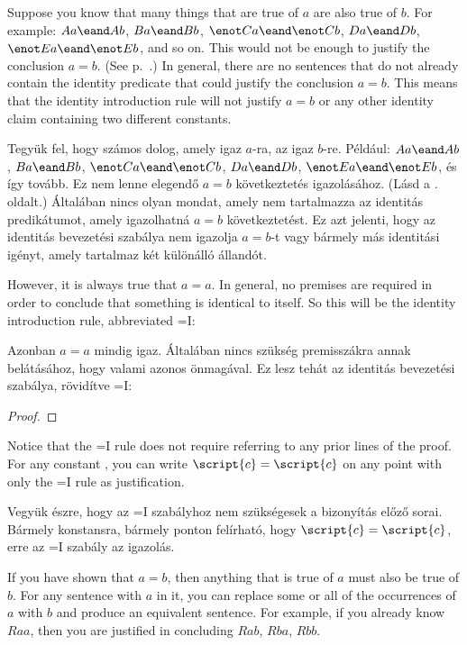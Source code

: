 Suppose you know that many things that are true of $a$ are also true of $b$. For example: $Aa\eand Ab$, $Ba\eand Bb$, $\enot Ca\eand\enot Cb$, $Da\eand Db$, $\enot Ea\eand\enot Eb$, and so on. This would not be enough to justify the conclusion $a=b$. (See p.~\pageref{model.nonidentity}.) In general, there are no sentences that do not already contain the identity predicate that could justify the conclusion $a=b$. This means that the identity introduction rule will not justify $a=b$ or any other identity claim containing two different constants.

Tegyük fel, hogy számos dolog, amely igaz  $a$-ra, az igaz $b$-re. Például: $Aa\eand Ab$, $Ba\eand Bb$, $\enot Ca\eand\enot Cb$, $Da\eand Db$, $\enot Ea\eand\enot Eb$, és így tovább. Ez nem lenne elegendő $a=b$ következtetés igazolásához. (Lásd a \pageref{model.nonidentity}. oldalt.) Általában nincs olyan mondat, amely nem tartalmazza az identitás predikátumot, amely igazolhatná $a=b$ következtetést. Ez azt jelenti, hogy az identitás bevezetési szabálya nem igazolja $a=b$-t vagy bármely más identitási igényt, amely tartalmaz két különálló állandót.

However, it is always true that $a=a$. In general, no premises are required in order to conclude that something is identical to itself. So this will be the identity introduction rule, abbreviated {=}I:

Azonban $a=a$ mindig igaz. Általában nincs szükség premisszákra annak belátásához, hogy valami azonos önmagával. Ez lesz tehát az identitás bevezetési szabálya, rövidítve {=}I:

\begin{proof}
	 
\end{proof}

Notice that the {=}I rule does not require referring to any prior lines of the proof. For any constant , you can write $\script{c}=\script{c}$ on any point with only the {=}I rule as justification.

Vegyük észre, hogy az {=}I szabályhoz nem szükségesek a bizonyítás előző sorai. Bármely  konstansra, bármely ponton felírható, hogy $\script{c}=\script{c}$, erre az {=}I szabály az igazolás.

If you have shown that $a=b$, then anything that is true of $a$ must also be true of $b$. For any sentence with $a$ in it, you can replace some or all of the occurrences of $a$ with $b$ and produce an equivalent sentence. For example, if you already know $Raa$, then you are justified in concluding $Rab$, $Rba$, $Rbb$.


